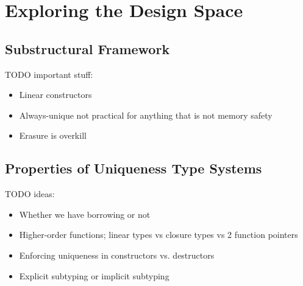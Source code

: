 \chapter{Exploring the Design Space}\label{sec:designspace}

\section{Substructural Framework}
TODO important stuff:
\begin{itemize}
	\item Linear constructors
	\item Always-unique not practical for anything that is not memory safety
	\item Erasure is overkill
\end{itemize}

\section{Properties of Uniqueness Type Systems}
TODO ideas:
\begin{itemize}
	\item Whether we have borrowing or not
	\item Higher-order functions; linear types vs closure types vs 2 function pointers
	\item Enforcing uniqueness in constructors vs. destructors
	\item Explicit subtyping or implicit subtyping
\end{itemize}